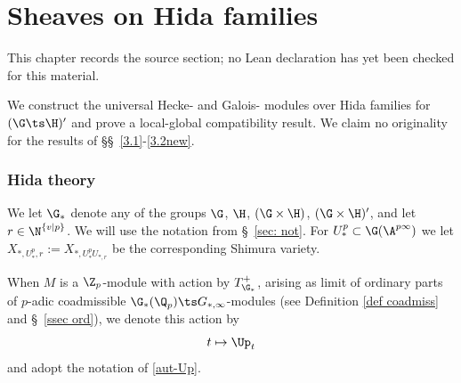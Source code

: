 \chapter{Sheaves on Hida families}
\label{universal-p-adic-gross-zagier-formula-chapter-03}

\begin{remark}
\label{universal-p-adic-gross-zagier-formula-chapter-03-source}
This chapter records the source section; no Lean declaration has yet been checked for this material.
\notready
\end{remark}

\label{section 3}
We construct the universal Hecke- and Galois- modules over Hida families for $(\G\ts\H)'$ and prove a local-global compatibility result. We claim no originality for the  results of \S\S~\ref{3.1}-\ref{3.2new}.
\subsection{Hida theory}
We let   $\G_{*}$ denote any of the groups $\G$, $\H$, $(\G\times \H)$, $(\G\times \H)'$, and let $r\in \N^{\{v\vert p\}}$. We will use the notation from \S~\ref{sec: not}.
 For $U_{*}^{p}\subset \G(\A^{p\infty})$ we let $X_{*, U_{*}^{p},r}:=X_{*, U_{*}^{p}U_{*,r}}$ be the corresponding Shimura variety.










  When $M$ is a $\Z_{p}$-module with   action by $T_{\G_{*}}^{+}$, arising as limit of ordinary parts of   $p$-adic coadmissible  $\G_{*}(\Q_{p})\ts G_{*, \infty}$-modules (see Definition \ref{def coadmiss} and \S~\ref{ssec ord}),
  we denote this action by
  $$t\mapsto \Up_{t}$$
  and adopt the notation of \eqref{aut-Up}.







